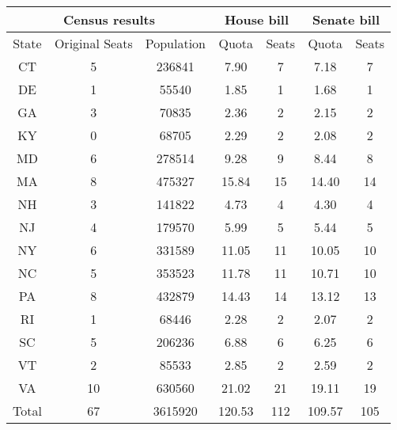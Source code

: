 \documentclass[10pt]{standalone}
\begin{document}
\begin{tabular}{|ccc|cc|cc|}
\hline
\multicolumn{3}{|c}{\textbf{Census results}} & \multicolumn{2}{|c}{\textbf{House bill}} & \multicolumn{2}{|c|}{\textbf{Senate bill}} \\ \hline
State & Original Seats & Population & Quota & Seats & Quota & Seats \\ \hline
CT & 5 & 236841 & 7.90 & 7 & 7.18 & 7 \\ 
DE & 1 & 55540 & 1.85 & 1 & 1.68 & 1 \\ 
GA & 3 & 70835 & 2.36 & 2 & 2.15 & 2 \\ 
KY & 0 & 68705 & 2.29 & 2 & 2.08 & 2 \\ 
MD & 6 & 278514 & 9.28 & 9 & 8.44 & 8 \\ 
MA & 8 & 475327 & 15.84 & 15 & 14.40 & 14 \\ 
NH & 3 & 141822 & 4.73 & 4 & 4.30 & 4 \\ 
NJ & 4 & 179570 & 5.99 & 5 & 5.44 & 5 \\ 
NY & 6 & 331589 & 11.05 & 11 & 10.05 & 10 \\ 
NC & 5 & 353523 & 11.78 & 11 & 10.71 & 10 \\ 
PA & 8 & 432879 & 14.43 & 14 & 13.12 & 13 \\ 
RI & 1 & 68446 & 2.28 & 2 & 2.07 & 2 \\ 
SC & 5 & 206236 & 6.88 & 6 & 6.25 & 6 \\ 
VT & 2 & 85533 & 2.85 & 2 & 2.59 & 2 \\ 
VA & 10 & 630560 & 21.02 & 21 & 19.11 & 19 \\ \hline
Total & 67 & 3615920 & 120.53 & 112 & 109.57 & 105 \\ \hline
\end{tabular}
\end{document}
